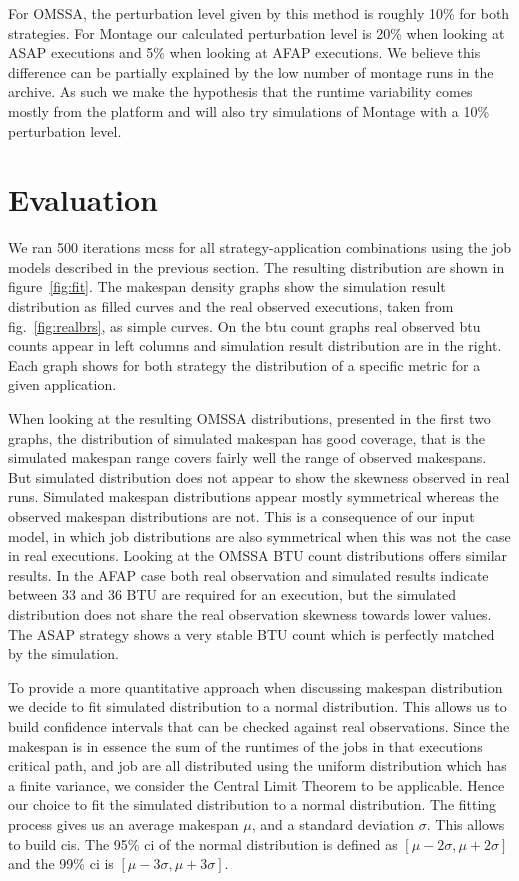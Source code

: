 \documentclass[10pt,conference,compsocconf]{IEEEtran}
\begin{document}
For OMSSA, the perturbation level given by this method is roughly 10\% for both
strategies. For Montage  our calculated perturbation level is  20\% when looking
at ASAP  executions and  5\% when  looking at AFAP  executions. We  believe this
difference can be partially  explained by the low number of  montage runs in the
archive. As such we make the hypothesis that the runtime variability comes
mostly from the platform and will also try simulations of Montage with a 10\%
perturbation level.

\section{Evaluation}
\label{sec:eval}

We ran 500 iterations \acp{mcs} for all strategy-application combinations using
the job models described in the previous section. The resulting distribution are
shown in figure~\ref{fig:fit}. The makespan density graphs show the simulation
result distribution as filled curves and the real observed executions, taken
from fig.~\ref{fig:realbrs}, as simple curves. On the \ac{btu} count graphs real
observed \ac{btu} counts appear in left columns and simulation result
distribution are in the right. Each graph shows for both strategy the
distribution of a specific metric for a given application.

When looking at the resulting OMSSA distributions, presented in the first two
graphs, the distribution of simulated makespan has good coverage, that is the
simulated makespan range covers fairly well the range of observed makespans. But
simulated distribution does not appear to show the skewness observed in real
runs. Simulated makespan distributions appear mostly symmetrical whereas the
observed makespan distributions are not. This is a consequence of our input
model, in which job distributions are also symmetrical when this was not the
case in real executions. Looking at the OMSSA BTU count distributions offers
similar results.  In the AFAP case both real observation and simulated results
indicate between 33 and 36 BTU are required for an execution, but the simulated
distribution does not share the real observation skewness towards lower values.
The ASAP strategy shows a very stable BTU count which is perfectly matched by
the simulation.

To provide a more quantitative approach when discussing makespan distribution we
decide to fit simulated distribution to a normal distribution. This allows us to
build confidence intervals that can be checked against real observations.  Since
the makespan is in essence the sum of the runtimes of the jobs in that
executions critical path, and job are all distributed using the uniform
distribution which has a finite variance, we consider the Central Limit Theorem
to be applicable. Hence our choice to fit the simulated distribution to a normal
distribution. The fitting process gives us an average makespan $\mu{}$, and a
standard deviation $\sigma{}$. This allows to build \acp{ci}. The 95\% \ac{ci}
of the normal distribution is defined as $[\mu{}-2\sigma{},\mu{}+2\sigma{}]$ and
the 99\% \ac{ci} is $[\mu{}-3\sigma{},\mu{}+3\sigma{}]$.
\end{document}

